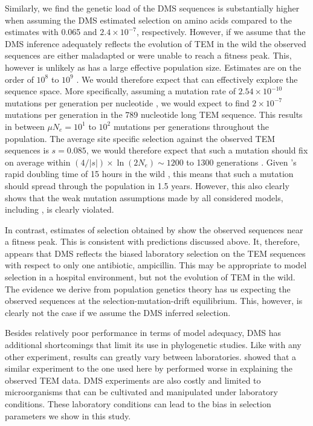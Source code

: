 \documentclass[12pt]{article}
\begin{document}
Similarly, we find the genetic load of the DMS sequences is substantially higher when assuming the DMS estimated selection on amino acids compared to the \selac estimates with 0.065 and  $2.4\times 10^{-7}$, respectively.
However, if we assume that the DMS inference adequately reflects the evolution of TEM in the wild the observed sequences are either maladapted or were unable to reach a fitness peak.
This, however is unlikely as \ecoli has a large effective population size.
Estimates are on the order of $10^8$ to $10^9$ \citep{OchmanAndWilson1987,hartl1994}.
We would therefore expect that \ecoli can effectively explore the sequence space.
More specifically, assuming a mutation rate of $2.54\times 10^{-10}$ mutations per generation per nucleotide \citep{lee2012}, we would expect to find $2\times 10^{-7}$ mutations per generation in the 789 nucleotide long TEM sequence.
This results in between $\mu N_e = 10^1$ to $10^2$ mutations per generations throughout the population.
The average site specific selection against the observed TEM sequences is $s = 0.085$, we would therefore expect that such a mutation should fix on average within $(4/|s|)\times \ln(2 N_e) \sim 1200$ to 1300 generations \citep{CrowAndKimura1970}.
Given \ecoli's rapid doubling time of 15 hours in the wild \citep{gibson2018}, this means that such a mutation should spread through the population in 1.5 years.
However, this also clearly shows that the weak mutation assumptions made by all considered models, including \selac, is clearly violated.

In contrast, estimates of selection obtained by \selac show the observed sequences near a fitness peak.
This is consistent with predictions discussed above.
It, therefore, appears that DMS reflects the biased laboratory selection on the TEM sequences with respect to only one antibiotic, ampicillin. 
This may be appropriate to model selection in a hospital environment, but not the evolution of TEM in the wild.
The evidence we derive from population genetics theory has us expecting the observed sequences at the selection-mutation-drift equilibrium.
This, however, is clearly not the case if we assume the DMS inferred selection.

Besides relatively poor performance in terms of model adequacy, DMS has additional shortcomings that limit its use in phylogenetic studies.
Like with any other experiment, results can greatly vary between laboratories.
\citet{hilton2017} showed that a similar experiment to the one used here by \citet{firnberg2014} performed worse in explaining the observed TEM data.
DMS experiments are also costly and limited to microorganisms that can be cultivated and manipulated under laboratory conditions.
These laboratory conditions can lead to the bias in selection parameters we show in this study.
\end{document}
